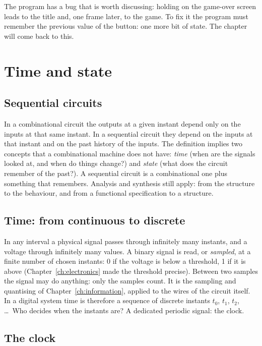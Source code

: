 The program has a bug that is worth discussing: holding  on the
game-over screen leads to the title and, one frame later, to the game. To fix
it the program must remember the previous value of the button: one more bit
of state. The chapter will come back to this.

\section{Time and state}

\subsection{Sequential circuits}

In a combinational circuit the outputs at a given instant depend only on the
inputs at that same instant. In a sequential circuit they depend on the
inputs at that instant and on the past history of the inputs. The definition
implies two concepts that a combinational machine does not have:
\emph{time} (when are the signals looked at, and when do things change?) and
\emph{state} (what does the circuit remember of the past?). A sequential
circuit is a combinational one plus something that remembers. Analysis and
synthesis still apply: from the structure to the behaviour, and from a
functional specification to a structure.

\subsection{Time: from continuous to discrete}

In any interval a physical signal passes through infinitely many instants, and
a voltage through infinitely many values. A binary signal is read, or
\emph{sampled}, at a finite number of chosen instants: 0 if the voltage is
below a threshold, 1 if it is above (Chapter~\ref{ch:electronics} made the
threshold precise). Between two samples the signal may do anything: only the
samples count. It is the sampling and quantising of
Chapter~\ref{ch:information}, applied to the wires of the circuit itself. In
a digital system time is therefore a sequence of discrete instants $t_0$,
$t_1$, $t_2$, \ldots\ Who decides when the instants are? A dedicated periodic
signal: the clock.

\subsection{The clock}

